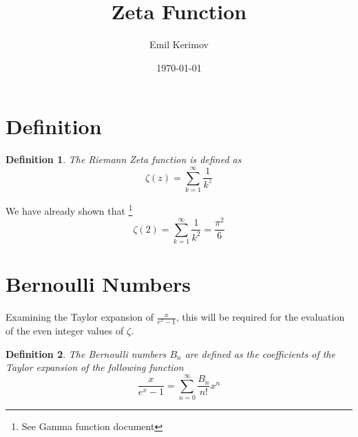 \documentclass[a4paper]{article}
\title{Zeta Function}
\author{Emil Kerimov}
\date{\today}
\begin{document}
\maketitle

\newtheorem{theorem}{Theorem}[section]
\newtheorem{corollary}{Corollary}[theorem]
\newtheorem{lemma}[theorem]{Lemma}
\newtheorem{definition}{Definition}[section]

\section{Definition}

\begin{definition}\label{zeta def}
The Riemann Zeta function is defined as 
$$
\zeta(z) = \sum_{k=1}^{\infty} \frac{1}{k^z}
$$
\end{definition}

We have already shown that \footnote{See Gamma function document}
\begin{equation}
\zeta(2) = \sum_{k=1}^{\infty} \frac{1}{k^2} =\frac{\pi^2}{6}
\end{equation}

\section{Bernoulli Numbers}
Examining the Taylor expansion of $\frac{x}{e^x -1}$, this will be required for the evaluation of the even integer values of $\zeta.$

\begin{definition}\label{bernoulli def}
The Bernoulli numbers $B_n$ are defined as the coefficients of the Taylor expansion of the following function
$$\boxed{
\frac{x}{e^x -1} = \sum_{n=0}^{\infty} \frac{B_n}{n!} x^n
}
$$
\end{definition}
\end{document}
